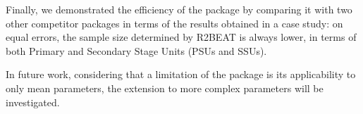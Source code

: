 Finally, we demonstrated the efficiency of the package by comparing it with two other competitor packages in terms of the results obtained in a case study: on equal errors, the sample size determined by R2BEAT is always lower,
in terms of both Primary and Secondary Stage Units (PSUs and SSUs).

In future work, considering that a limitation of the package is its applicability to only mean parameters, the
extension to more complex parameters will be investigated.


